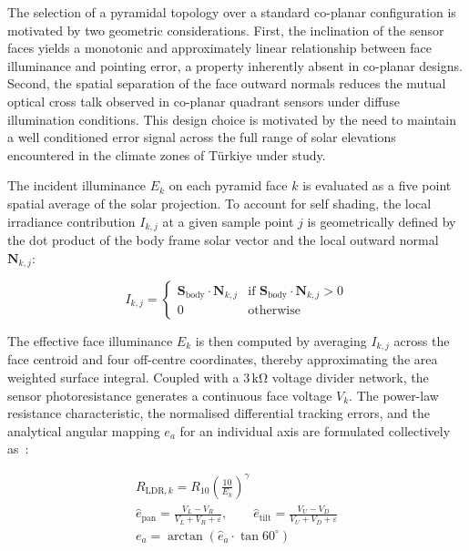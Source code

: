 \documentclass[preprint,3p,12pt]{elsarticle}
\newcommand{\Svec}{\mathbf{S}}
\newcommand{\Nvec}{\mathbf{N}}
\begin{document}
The selection of a pyramidal topology over a standard co-planar configuration is motivated by two geometric considerations. First, the inclination of the sensor faces yields a monotonic and approximately linear relationship between face illuminance and pointing error, a property inherently absent in co-planar designs. Second, the spatial separation of the face outward normals reduces the mutual optical cross talk observed in co-planar quadrant sensors under diffuse illumination conditions. This design choice is motivated by the need to maintain a well conditioned error signal across the full range of solar elevations encountered in the climate zones of Türkiye under study.

The incident illuminance $E_k$ on each pyramid face $k$ is evaluated as a five point spatial average of the solar projection. To account for self shading, the local irradiance contribution $I_{k,j}$ at a given sample point $j$ is geometrically defined by the dot product of the body frame solar vector and the local outward normal $\Nvec_{k,j}$:

\begin{equation}
    I_{k,j} = \begin{cases} 
        \Svec_{\mathrm{body}} \cdot \Nvec_{k,j} & \text{if } \Svec_{\mathrm{body}} \cdot \Nvec_{k,j} > 0 \\
        0 & \text{otherwise}
    \end{cases}
    \label{eq:irradiance_contribution}
\end{equation}

The effective face illuminance $E_k$ is then computed by averaging $I_{k,j}$ across the face centroid and four off-centre coordinates, thereby approximating the area weighted surface integral. Coupled with a $3\,\mathrm{k\Omega}$ voltage divider network, the sensor photoresistance generates a continuous face voltage $V_k$. The power-law resistance characteristic, the normalised differential tracking errors, and the analytical angular mapping $e_a$ for an individual axis are formulated collectively as~\cite{GL5528}:

\begin{gather}
    R_{\mathrm{LDR},k} = R_{10}\left(\frac{10}{E_k}\right)^{\gamma} \label{eq:resistance} \\[6pt]
    \hat{e}_{\mathrm{pan}} = \frac{V_L - V_R}{V_L + V_R + \varepsilon}, \qquad \hat{e}_{\mathrm{tilt}} = \frac{V_U - V_D}{V_U + V_D + \varepsilon} \label{eq:ldr_signals} \\[6pt]
    e_a = \arctan\!\left(\hat{e}_a \cdot \tan 60^\circ\right) \label{eq:angular_errors}
\end{gather}
\end{document}
